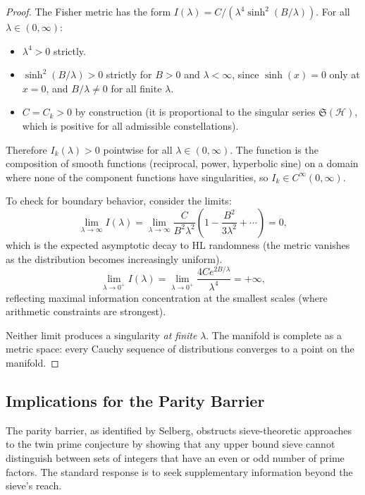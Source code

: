 \documentclass[11pt]{article}
\theoremstyle{remark}
\begin{document}
\begin{proof}
The Fisher metric has the form $I(\lambda) = C/(\lambda^4 \sinh^2(B/\lambda))$.
For all $\lambda \in (0, \infty)$:

\begin{itemize}
    \item $\lambda^4 > 0$ strictly.
    \item $\sinh^2(B/\lambda) > 0$ strictly for $B > 0$ and $\lambda < \infty$,
    since $\sinh(x) = 0$ only at $x = 0$, and $B/\lambda \neq 0$ for all finite $\lambda$.
    \item $C = C_k > 0$ by construction (it is proportional to the
    singular series $\mathfrak{S}(\mathcal{H})$, which is positive for all
    admissible constellations).
\end{itemize}

Therefore $I_k(\lambda) > 0$ pointwise for all $\lambda \in (0, \infty)$.
The function is the composition of smooth functions (reciprocal, power,
hyperbolic sine) on a domain where none of the component functions have
singularities, so $I_k \in C^\infty(0, \infty)$.

To check for boundary behavior, consider the limits:
\begin{equation}
\lim_{\lambda \to \infty} I(\lambda) = \lim_{\lambda \to \infty}
\frac{C}{B^2 \lambda^2} \left(1 - \frac{B^2}{3\lambda^2} + \cdots\right) = 0,
\end{equation}
which is the expected asymptotic decay to HL randomness (the metric
vanishes as the distribution becomes increasingly uniform).
\begin{equation}
\lim_{\lambda \to 0^+} I(\lambda) = \lim_{\lambda \to 0^+}
\frac{4C e^{2B/\lambda}}{\lambda^4} = +\infty,
\end{equation}
reflecting maximal information concentration at the smallest scales
(where arithmetic constraints are strongest).

Neither limit produces a singularity \emph{at finite} $\lambda$. The
manifold is complete as a metric space: every Cauchy sequence of
distributions converges to a point on the manifold. \qedhere
\end{proof}

\subsection{Implications for the Parity Barrier}

The parity barrier, as identified by Selberg, obstructs sieve-theoretic
approaches to the twin prime conjecture by showing that any upper bound
sieve cannot distinguish between sets of integers that have an even or
odd number of prime factors. The standard response is to seek
supplementary information beyond the sieve's reach.
\end{document}
